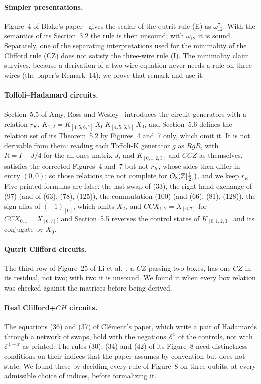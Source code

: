 \paragraph{Simpler presentations.} Figure~4 of Blake's
paper~\cite{blake2026simpler} gives the scalar of the qutrit rule (E) as
$\omega_{12}^7$. With the semantics of its Section~3.2 the rule is then
unsound; with $\omega_{12}$ it is sound. Separately, one of the
separating interpretations used for the minimality of the Clifford
rule (CZ) does not satisfy the three-wire rule (I). The minimality
claim survives, because a derivation of a two-wire equation never needs
a rule on three wires (the paper's Remark~14); we prove that remark and
use it.

\paragraph{Toffoli--Hadamard circuits.} Section~5.5 of Amy, Ross and
Wesley~\cite{amy2024toffoli} introduces the circuit generators with a
relation $r_K$, $K_{1,2} = K_{[4,5,6,7]}\,X_0\,K_{[4,5,6,7]}\,X_0$, and
Section~5.6 defines the relation set of its Theorem~5.2 by Figures~4
and~7 only, which omit it. It is not derivable from them: reading each
Toffoli-K generator $g$ as $RgR$, with $R = I - J/4$ for the all-ones
matrix $J$, and $K_{[0,1,2,3]}$ and $CCZ$ as themselves, satisfies the
corrected Figures~4 and~7 but not $r_K$, whose sides then differ in
entry $(0,0)$; so those relations are not complete for
$O_8(\mathbb{Z}[\frac12])$, and we keep $r_K$. Five printed formulas are
false: the last swap of (33), the right-hand exchange of (97) (and of
(63), (78), (125)), the commutation (100) (and (66), (81), (128)), the
sign alias of $(-1)_{[0]}$, which omits $X_2$, and $CCX_{1,2}=X_{[6,7]}$
for $CCX_{0,1}=X_{[6,7]}$; and Section~5.5 reverses the control states
of $K_{[0,1,2,3]}$ and its conjugate by $X_0$.

\paragraph{Qutrit Clifford circuits.} The third row of Figure~25 of Li
et al.~\cite{li2025qutrit}, a $CZ$ passing two boxes, has one $CZ$ in
its residual, not two; with two it is unsound. We found it when every
box relation was checked against the matrices before being derived.

\paragraph{Real Clifford+$CH$ circuits.} The equations (36) and (37) of
Cl\'ement's paper, which write a pair of Hadamards through a network of
swaps, hold with the negations $\mathcal{E}^x$ of the controls, not
with $\mathcal{E}^{1-x}$ as printed. The rules (30), (34) and (42) of its
Figure~8 need distinctness conditions on their indices that the paper
assumes by convention but does not state. We found these by deciding
every rule of Figure~8 on three qubits, at every admissible choice of
indices, before formalizing it.


